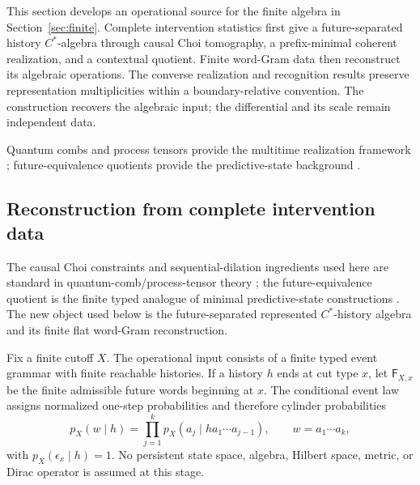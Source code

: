 \documentclass[11pt]{article}
\theoremstyle{definition}
\theoremstyle{remark}
\theoremstyle{definition}
\theoremstyle{remark}
\begin{document}
This section develops an operational source for the finite algebra
in Section~\ref{sec:finite}.  Complete intervention statistics first give a
future-separated history $C^*$-algebra through causal Choi tomography,
a prefix-minimal coherent realization, and a contextual quotient.  Finite
word-Gram data then reconstruct its algebraic operations.  The converse
realization and recognition results preserve representation multiplicities
within a boundary-relative convention.  The construction recovers the
algebraic input; the differential and its scale remain independent data.

Quantum combs and process tensors provide the multitime realization framework
\cite{ChiribellaDArianoPerinotti2009,BisioDArianoPerinottiChiribella2011,PollockEtAl2018};
future-equivalence quotients provide the predictive-state background
\cite{shalizicrutchfield,TraversCrutchfield2014,MarzenCrutchfield2017}.

\subsection{Reconstruction from complete intervention data}
\label{subsec:operational-reconstruction}

The causal Choi constraints and sequential-dilation ingredients used here are
standard in quantum-comb/process-tensor theory
\cite{ChiribellaDArianoPerinotti2009,PollockEtAl2018}; the future-equivalence
quotient is the finite typed analogue of minimal predictive-state constructions
\cite{shalizicrutchfield,TraversCrutchfield2014,MarzenCrutchfield2017}.  The new
object used below is the future-separated represented $C^*$-history algebra and
its finite flat word-Gram reconstruction.

Fix a finite cutoff $X$.  The operational input consists of a finite typed
event grammar with finite reachable histories.  If a history $h$ ends at cut type
$x$, let $\mathsf F_{X,x}$ be the finite admissible future words beginning at $x$.
The conditional event law assigns normalized one-step probabilities and therefore
cylinder probabilities
\begin{equation}
 p_X(w\mid h)
 =\prod_{j=1}^{k}p_X(a_j\mid ha_1\cdots a_{j-1}),
 \qquad w=a_1\cdots a_k,
\label{eq:ncg-chain-law}
\end{equation}
with $p_X(\epsilon_x\mid h)=1$.  No persistent state space, algebra, Hilbert
space, metric, or Dirac operator is assumed at this stage.
\end{document}
